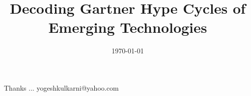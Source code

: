 \documentclass[xcolor=dvipsnames,compress,t,pdf]{beamer}
\title[Zen Habits \hspace{4cm} \insertframenumber /\inserttotalframenumber]
{Decoding Gartner Hype Cycles of Emerging Technologies}
\subtitle[]{}
\date[2014]{\today}
\begin{document}
\begin{frame}
\titlepage
\end{frame}




\begin{frame}[c]{}
Thanks ...
\vspace{5mm}
yogeshkulkarni@yahoo.com
\end{frame}
\end{document}
